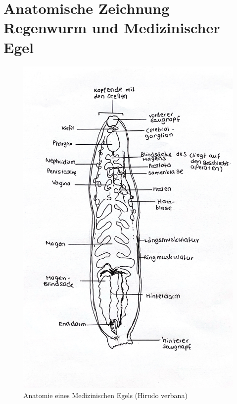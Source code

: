 \documentclass[oneside,10pt,a4paper]{report}
\begin{document}
		\section{Anatomische Zeichnung Regenwurm und Medizinischer Egel}
		\begin{figure}[H]
			\centering
			\includegraphics[scale=0.25]{Egel.JPG}
			\caption{Anatomie eines Medizinischen Egels (Hirudo verbana)}
			\label{fig:Egel_ana}
		\end{figure}
		
\end{document}
